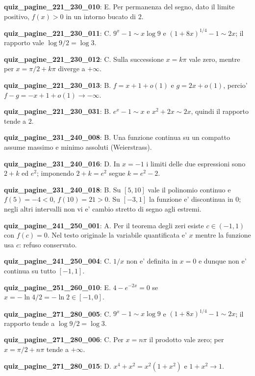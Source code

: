 \documentclass[11pt,a4paper]{article}
\newcounter{quiz}
\begin{document}
\noindent\textbf{quiz\_pagine\_221\_230\_010}: E. Per permanenza del segno, dato il limite positivo, $f(x)>0$ in un intorno bucato di $2$.\par\medskip
\noindent\textbf{quiz\_pagine\_221\_230\_011}: C. $9^x-1\sim x\log9$ e $(1+8x)^{1/4}-1\sim2x$; il rapporto vale $\log9/2=\log3$.\par\medskip
\noindent\textbf{quiz\_pagine\_221\_230\_012}: C. Sulla successione $x=k\pi$ vale zero, mentre per $x=\pi/2+k\pi$ diverge a $+\infty$.\par\medskip
\noindent\textbf{quiz\_pagine\_221\_230\_013}: B. $f=x+1+o(1)$ e $g=2x+o(1)$, percio' $f-g=-x+1+o(1)\to-\infty$.\par\medskip
\noindent\textbf{quiz\_pagine\_221\_230\_031}: B. $e^x-1\sim x$ e $x^2+2x\sim2x$, quindi il rapporto tende a $2$.\par\medskip
\noindent\textbf{quiz\_pagine\_231\_240\_008}: B. Una funzione continua su un compatto assume massimo e minimo assoluti (Weierstrass).\par\medskip
\noindent\textbf{quiz\_pagine\_231\_240\_016}: D. In $x=-1$ i limiti delle due espressioni sono $2+k$ ed $e^2$; imponendo $2+k=e^2$ segue $k=e^2-2$.\par\medskip
\noindent\textbf{quiz\_pagine\_231\_240\_018}: B. Su $[5,10]$ vale il polinomio continuo e $f(5)=-4<0$, $f(10)=21>0$. Su $[-3,1]$ la funzione e' discontinua in $0$; negli altri intervalli non vi e' cambio stretto di segno agli estremi.\par\medskip
\noindent\textbf{quiz\_pagine\_241\_250\_001}: A. Per il teorema degli zeri esiste $c\in(-1,1)$ con $f(c)=0$. Nel testo originale la variabile quantificata e' $x$ mentre la funzione usa $c$: refuso conservato.\par\medskip
\noindent\textbf{quiz\_pagine\_241\_250\_004}: C. $1/x$ non e' definita in $x=0$ e dunque non e' continua su tutto $[-1,1]$.\par\medskip
\noindent\textbf{quiz\_pagine\_251\_260\_010}: E. $4-e^{-2x}=0$ se $x=-\ln4/2=-\ln2\in[-1,0]$.\par\medskip
\noindent\textbf{quiz\_pagine\_271\_280\_005}: C. $9^x-1\sim x\log9$ e $(1+8x)^{1/4}-1\sim2x$; il rapporto tende a $\log9/2=\log3$.\par\medskip
\noindent\textbf{quiz\_pagine\_271\_280\_006}: C. Per $x=n\pi$ il prodotto vale zero; per $x=\pi/2+n\pi$ tende a $+\infty$.\par\medskip
\noindent\textbf{quiz\_pagine\_271\_280\_015}: D. $x^4+x^2=x^2(1+x^2)$ e $1+x^2\to1$.\par\medskip
\end{document}
